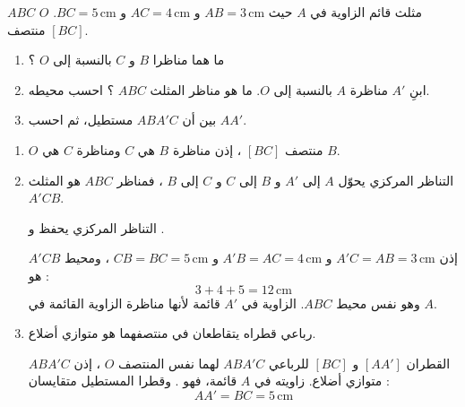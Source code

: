 \documentclass[12pt,a4paper]{article}
\newcommand{\cm}{\,\mathrm{cm}}
\begin{document}
\begin{corr}[title={مثلث قائم ومنتصف الوتر}, stars=2, source={Axiomaths}]
$ABC$ مثلث قائم الزاوية في $A$ حيث $AB=3\cm$ و $AC=4\cm$ و $BC=5\cm$. $O$ منتصف $[BC]$.
\begin{center}
\end{center}
\begin{enumerate}
  \item ما هما مناظرا $B$ و $C$ بالنسبة إلى $O$ ؟
  \item ابنِ $A'$ مناظرة $A$ بالنسبة إلى $O$. ما هو مناظر المثلث $ABC$ ؟ احسب محيطه.
  \item بين أن $ABA'C$ مستطيل، ثم احسب $AA'$.
\end{enumerate}
\axsol
\begin{enumerate}[itemsep=14pt]
  \item $O$ منتصف $[BC]$ ، إذن مناظرة $B$ هي $C$ ومناظرة $C$ هي $B$.
  \item التناظر المركزي يحوّل $A$ إلى $A'$ و $B$ إلى $C$ و $C$ إلى $B$ ، فمناظر $ABC$ هو المثلث $A'CB$.
  \begin{prop}
  التناظر المركزي يحفظ  و .
  \end{prop}
  إذن $A'C=AB=3\cm$ و $A'B=AC=4\cm$ و $CB=BC=5\cm$ ، ومحيط $A'CB$ هو :
  \[3+4+5=12\cm\]
  وهو نفس محيط $ABC$. الزاوية في $A'$ قائمة لأنها مناظرة الزاوية القائمة في $A$.
  \begin{center}
  \end{center}
  \item \begin{prop}
  رباعي قطراه يتقاطعان في منتصفهما هو متوازي أضلاع.
  \end{prop}
  القطران $[AA']$ و $[BC]$ للرباعي $ABA'C$ لهما نفس المنتصف $O$ ، إذن $ABA'C$ متوازي أضلاع.
  زاويته في $A$ قائمة، فهو . وقطرا المستطيل متقايسان :
  \[AA'=BC=5\cm\]
\end{enumerate}
\end{corr}
\end{document}

